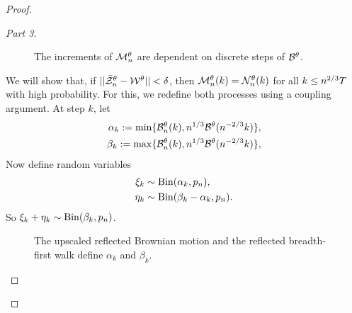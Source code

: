 \begin{proof}
\begin{proof}[Part 3]
\begin{figure}[ht]
	\hspace*{1.1in}
	
	\caption{The increments of $\mathcal{M}_n^{\theta}$ are dependent on discrete steps of $\mathcal{B}^{\theta}$.} 
	\label{F: Mn}
\end{figure}

We will show that, if $||\bar{\mathcal{Z}}^{\theta}_n - \mathcal{W}^{\theta}|| < \delta$, 
then $\mathcal{M}_n^{\theta}(k) = \mathcal{N}_n^{\theta}(k)$ for all $k \leq n^{2 / 3}T$ with high probability.
For this, we redefine both processes using a coupling argument.
At step $k$, let
\begin{equation} \label{E: def alpha beta}
\begin{aligned}
\alpha_k := \min\lbrace\mathcal{B}_n^{\theta}(k), n^{1 / 3}\mathcal{B}^{\theta}(n^{-2 / 3}k)\rbrace, \\
\beta_k := \max\lbrace\mathcal{B}_n^{\theta}(k), n^{1 / 3}\mathcal{B}^{\theta}(n^{-2 / 3}k)\rbrace,
\end{aligned}
\end{equation}
Now define random variables
\begin{equation} \label{E: def xi eta}
\begin{aligned}
\xi_k &\sim \operatorname*{Bin}(\alpha_k, p_n), \\
\eta_k &\sim \operatorname*{Bin}(\beta_k - \alpha_k, p_n).
\end{aligned}
\end{equation}
So $\xi_k + \eta_k \sim \operatorname*{Bin}(\beta_k, p_n)$.

\begin{figure}[ht]
	\centering
	
	\caption{The upscaled reflected Brownian motion and the reflected breadth-first walk define $\alpha_k$ and $\beta_k$.} 
	\label{F: BM BF-walk}
\end{figure}


\end{proof}
\end{proof}
